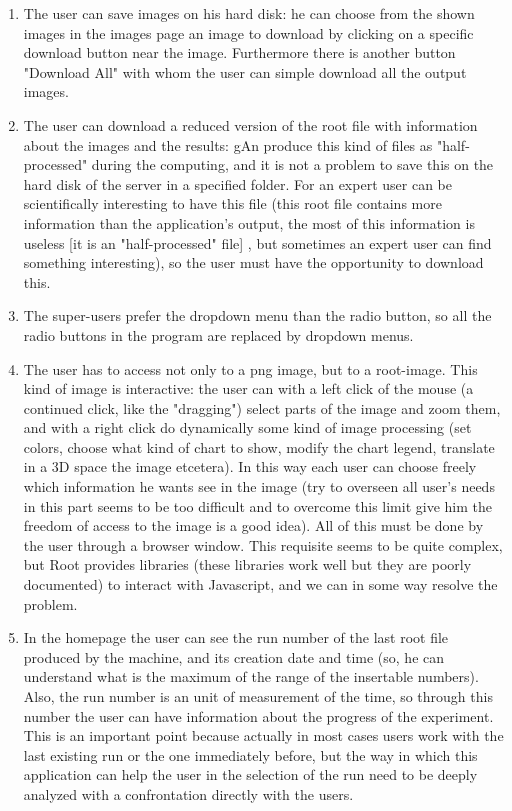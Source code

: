 \begin{enumerate}
\item The user can save images on his hard disk: he can choose from the shown images in the images page an image to download by clicking on a specific download button near the image. Furthermore there is another button "Download All" with whom the user can simple download all the output images.

\item The user can download a reduced version of the root file with information about the images and the results: gAn produce this kind of files as "half-processed" during the computing, and it is not a problem to save this on the hard disk of the server in a specified folder. For an expert user can be scientifically interesting to have this file (this root file contains more information than the application's output, the most of this information is useless [it is an "half-processed" file] , but sometimes an expert user can find something interesting), so the user must have the opportunity to download this.     

\item The super-users prefer the dropdown menu than the radio button, so all the radio buttons in the program are replaced by dropdown menus.

\item The user has to access not only to a png image, but to a root-image. This kind of image is interactive: the user can with a left click of the mouse (a continued click, like the "dragging") select parts of the image and zoom them, and with a right click do dynamically some kind of image processing (set colors, choose what kind of chart to show, modify the chart legend, translate in a 3D space the image etcetera). In this way each user can choose freely which information he wants see in the image (try to overseen all user's needs in this part seems to be too difficult and to overcome this limit give him the freedom of access to the image is a good idea).
All of this must be done by the user through a browser window. This requisite seems to be quite complex, but Root provides libraries (these libraries work well but they are poorly documented) to interact with Javascript, and we can in some way resolve the problem.  

\item In the homepage the user can see the run number of the last root file produced by the machine, and its creation date and time (so, he can understand what is the maximum of the range of the insertable numbers). Also, the run number is an unit of measurement of the time, so through this number the user can have information about the progress of the experiment. This is an important point because actually in most cases users work with the last existing run or the one immediately before, but the way in which this application can help the user in the selection of the run need to be deeply analyzed with a confrontation directly with the users. 


\end{enumerate}
